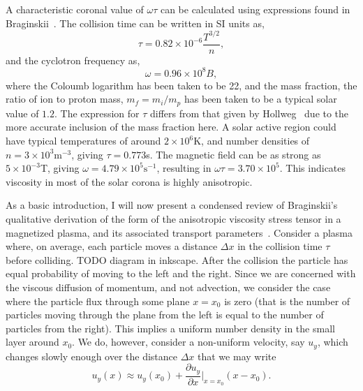 A characteristic coronal value of $\omega \tau$ can be calculated using expressions found in Braginskii~\cite{braginskiiTransportProcessesPlasma1965}. The collision time can be written in SI units as,
\begin{equation}
  \label{eq:collision_time}
  \tau = 0.82 \times 10^{-6} \frac{T^{3/2}}{n},
\end{equation}
and the cyclotron frequency as,
\begin{equation}
  \label{eq:cyclotron_frequency}
  \omega = 0.96\times10^8 B,
\end{equation}
where the Coloumb logarithm has been taken to be 22, and the mass fraction, the ratio of ion to proton mass, $m_f = m_i/m_p$ has been taken to be a typical solar value of $1.2$. The expression for $\tau$ differs from that given by Hollweg~\cite{hollwegViscosityMagnetizedPlasma1985} due to the more accurate inclusion of the mass fraction here. A solar active region could have typical temperatures of around $2\times 10^6$K, and number densities of $n = 3 \times 10^3\text{m}^{-3}$, giving $\tau = 0.773$s. The magnetic field can be as strong as $5\times 10^{-3}$T, giving $\omega = 4.79 \times 10^5 \text{s}^{-1}$, resulting in $\omega \tau = 3.70 \times 10^5$. This indicates viscosity in most of the solar corona is highly anisotropic.

As a basic introduction, I will now present a condensed review of Braginskii's qualitative derivation of the form of the anisotropic viscosity stress tensor in a magnetized plasma, and its associated transport parameters~\cite{braginskiiTransportProcessesPlasma1965}. Consider a plasma where, on average, each particle moves a distance $\Delta x$ in the collision time $\tau$ before colliding. TODO diagram in inkscape. After the collision the particle has equal probability of moving to the left and the right. Since we are concerned with the viscous diffusion of momentum, and not advection, we consider the case where the particle flux through some plane $x=x_0$ is zero (that is the number of particles moving through the plane from the left is equal to the number of particles from the right). This implies a uniform number density in the small layer around $x_0$. We do, however, consider a non-uniform velocity, say $u_y$, which changes slowly enough over the distance $\Delta x$ that we may write
\begin{equation}
  \label{eq:viscous_derivation_vy}
u_y (x) \approx u_y(x_0) + \frac{\partial u_y}{\partial x} |_{x=x_0} (x - x_0).
\end{equation}

